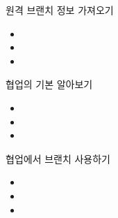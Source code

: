 \documentclass[aspectratio=1610,20pt,xcolor=pdftex,dvipsnames,table,handout]{beamer}
\begin{document}
		\begin{frame} [t,plain]
			\begin{block} {원격 브랜치 정보 가져오기}
			\setlength{\leftmargini}{1em}			
			\begin{itemize}
				\item 	
				\item 	
				\item 	
			\end{itemize}
			\end{block}						
		\end{frame}						

		\begin{frame} [t,plain]
			\begin{block} {협업의 기본 알아보기}
			\setlength{\leftmargini}{1em}			
			\begin{itemize}
				\item 	
				\item 	
				\item 	
			\end{itemize}
			\end{block}						
		\end{frame}						

		\begin{frame} [t,plain]
			\begin{block} {협업에서 브랜치 사용하기}
			\setlength{\leftmargini}{1em}			
			\begin{itemize}
				\item 	
				\item 	
				\item 	
			\end{itemize}
			\end{block}						
		\end{frame}						


		\begin{frame} [t,plain]
		\end{frame}						

		\begin{frame} [t,plain]
		\end{frame}						



\end{document}
